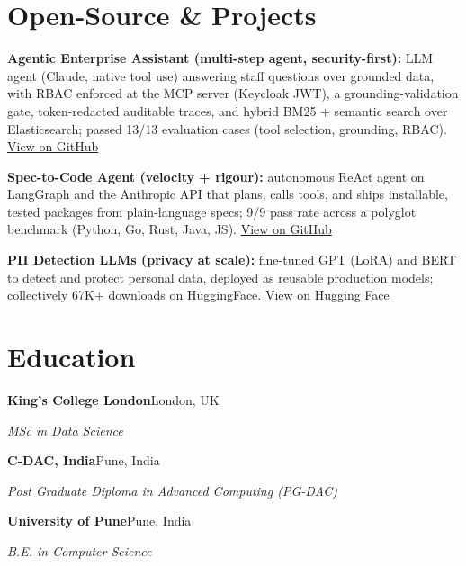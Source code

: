 \documentclass[10pt,a4paper]{article}
\begin{document}
\section{Open-Source \& Projects}
\begin{tight}
  \item \textbf{Agentic Enterprise Assistant (multi-step agent, security-first):} LLM agent (Claude, native tool use) answering staff questions over grounded data, with RBAC enforced at the MCP server (Keycloak JWT), a grounding-validation gate, token-redacted auditable traces, and hybrid BM25 + semantic search over Elasticsearch; passed 13/13 evaluation cases (tool selection, grounding, RBAC). \href{https://github.com/abhijeetscode/Agentic-Enterprise-Assistant}{View on GitHub}
  \item \textbf{Spec-to-Code Agent (velocity + rigour):} autonomous ReAct agent on LangGraph and the Anthropic API that plans, calls tools, and ships installable, tested packages from plain-language specs; 9/9 pass rate across a polyglot benchmark (Python, Go, Rust, Java, JS). \href{https://github.com/abhijeetscode/Spec-to-Code-Agent}{View on GitHub}
  \item \textbf{PII Detection LLMs (privacy at scale):} fine-tuned GPT (LoRA) and BERT to detect and protect personal data, deployed as reusable production models; collectively 67K+ downloads on HuggingFace. \href{https://huggingface.co/ab-ai/pii_model}{View on Hugging Face}
\end{tight}

\section{Education}
{\color{company}\bfseries King's College London}\hfill {\color{muted}London, UK}\par
{\itshape MSc in Data Science}\par\vspace{2pt}
{\color{company}\bfseries C-DAC, India}\hfill {\color{muted}Pune, India}\par
{\itshape Post Graduate Diploma in Advanced Computing (PG-DAC)}\par\vspace{2pt}
{\color{company}\bfseries University of Pune}\hfill {\color{muted}Pune, India}\par
{\itshape B.E. in Computer Science}\par
\end{document}
